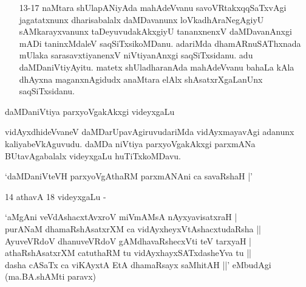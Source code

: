 \begin{itemize}

\item [13-17] naMtara shUlapANiyAda mahAdeVvanu savoVRtakxqqSaTxvAgi jagatatxnunx dharisabalalx daMDavanunx loVkadhAraNegAgiyU sAMkarayxvanunx taDeyuvudakAkxgiyU tananxnenxV daMDavanAnxgi mADi taninxMdaleV saqSiTxsikoMDanu. adariMda dhamARnuSAThxnada mUlaka sarasavxtiyanenxV niVtiyanAnxgi saqSiTxsidanu. adu daMDaniVtiyAyitu. matetx shUladharanAda mahAdeVvanu bahaLa kAla dhAyxna maganxnAgidudx anaMtara elAlx shAsatxrXgaLanUnx saqSiTxsidanu.
\end{itemize}

daMDaniVtiya parxyoVgakAkxgi videyxgaLu

vidAyxdhideVvaneV daMDarUpavAgiruvudariMda vidAyxmayavAgi adanunx kaliyabeVkAguvudu. daMDa niVtiya parxyoVgakAkxgi parxmANa BUtavAgabalalx videyxgaLu huTiTxkoMDavu.

\begin{shloka}
`daMDaniVteVH parxyoVgAthaRM parxmANAni ca savaRshaH |'
\end{shloka}

14 athavA 18 videyxgaLu -

\begin{shloka}
`aMgAni veVdAshacxtAvxroV miVmAMsA nAyxyavisatxraH |\\
purANaM dhamaRshAsatxrXM ca vidAyxheyxVtAshacxtudaRsha ||\\

AyuveVRdoV dhanuveVRdoV gAMdhavaRshecxVti teV tarxyaH |\\
athaRshAsatxrXM catuthaRM tu vidAyxhayxSATxdasheYva tu ||\\

dasha cASaTx ca viKAyxtA EtA dhamaRsayx saMhitAH ||' eMbudAgi\\
(ma.BA.shAMti paravx)
\end{shloka}

